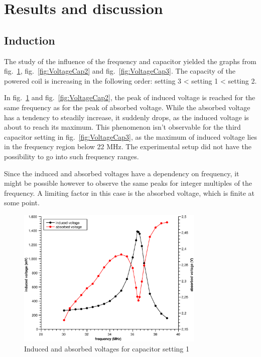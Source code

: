 \documentclass{scrartcl}
\begin{document}
\section{Results and discussion}

\subsection{Induction}
The study of the influence of the frequency and capacitor yielded the graphs from fig.~\ref{fig:VoltageCap1}, fig.~\ref{fig:VoltageCap2} and fig.~\ref{fig:VoltageCap3}. The capacity of the powered coil is increasing in the following order: setting 3 < setting 1 < setting 2.

In fig.~\ref{fig:VoltageCap1} and fig.~\ref{fig:VoltageCap2}, the peak of induced voltage is reached for the same frequency as for the peak of absorbed voltage. While the absorbed voltage has a tendency to steadily increase, it suddenly drops, as the induced voltage is about to reach its maximum. This phenomenon isn't observable for the third capacitor setting in fig.~\ref{fig:VoltageCap3}, as the maximum of induced voltage lies in the frequency region below 22 MHz. The experimental setup did not have the possibility to go into such frequency ranges. 

Since the induced and absorbed voltages have a dependency on frequency, it might be possible however to observe the same peaks for integer multiples of the frequency. A limiting factor in this case is the absorbed voltage, which is finite at some point. 

\begin{figure}[!ht]
    \centering
    \includegraphics[width=0.8\textwidth]{Capacitor1.eps}
    \caption{Induced and absorbed voltages for capacitor setting 1}
    \label{fig:VoltageCap1}
\end{figure}
\end{document}
